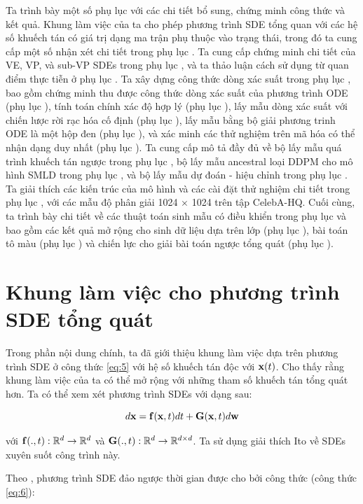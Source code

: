 \documentclass{article} %
\begin{document}
Ta trình bày một số phụ lục với các chi tiết bổ sung, chứng minh công thức và kết quả.
Khung làm việc của ta cho phép phương trình SDE tổng quan với các hệ số khuếch tán có giá trị dạng ma trận phụ thuộc vào trạng thái, trong đó ta cung cấp một số nhận xét chi tiết trong phụ lục .
Ta cung cấp chứng minh chi tiết của VE, VP, và sub-VP SDEs trong phụ lục , và ta thảo luận cách sử dụng từ quan điểm thực tiễn ở phụ lục .
Ta xây dựng công thức dòng xác suất trong phụ lục , bao gồm chứng minh thu được công thức dòng xác suất của phương trình ODE (phụ lục ), tính toán chính xác độ hợp lý (phụ lục ), lấy mẫu dòng xác suất với chiến lược rời rạc hóa cố định (phụ lục ),
lấy mẫu bằng bộ giải phương trinh ODE là một hộp đen (phụ lục ), và xác minh các thử nghiệm trên mã hóa có thể nhận dạng duy nhất (phụ lục ).
Ta cung cấp mô tả đầy đủ về bộ lấy mẫu quá trình khuếch tán ngược trong phụ lục ,
bộ lấy mẫu ancestral loại DDPM cho mô hình SMLD trong phụ lục , và bộ lấy mẫu dự đoán - hiệu chỉnh trong phụ lục .
Ta giải thích các kiến trúc của mô hình và các cài đặt thử nghiệm chi tiết trong phụ lục ,
với các mẫu độ phân giải 1024 $\times$ 1024 trên tập CelebA-HQ.
Cuối cùng, ta trình bày chi tiết về các thuật toán sinh mẫu có điều khiển trong phụ lục  và bao gồm các kết quả mở rộng cho sinh dữ liệu dựa trên lớp (phụ lục ),
bài toán tô màu (phụ lục ) và chiến lực cho giải bài toán ngược tổng quát (phụ lục ).

\section{Khung làm việc cho phương trình SDE tổng quát}

Trong phần nội dung chính, ta đã giới thiệu khung làm việc dựa trên phương trình SDE ở công thức \ref{eq:5} với hệ số khuếch tán độc với $\bold{x}(t)$.
Cho thấy rằng khung làm việc của ta có thể mở rộng với những tham số khuếch tán tổng quát hơn.
Ta có thể xem xét phương trình SDEs với dạng sau:

\begin{equation} \label{eq:15}
    d \bold{x} = \bold{f} (\bold{x}, t) dt + \bold{G} (\bold{x}, t) d\bold{w}
\end{equation}

với $\bold{f}(., t): \mathbb{R}^d \rightarrow \mathbb{R}^d$ và $\bold{G}(., t): \mathbb{R}^d \rightarrow \mathbb{R}^{d \times d}$.
Ta sử dụng giải thích Ito về SDEs xuyên suốt công trình này.

Theo \citep{anderson1982reverse}, phương trình SDE đảo ngược thời gian được cho bởi công thức (công thức \ref{eq:6}):
\end{document}
